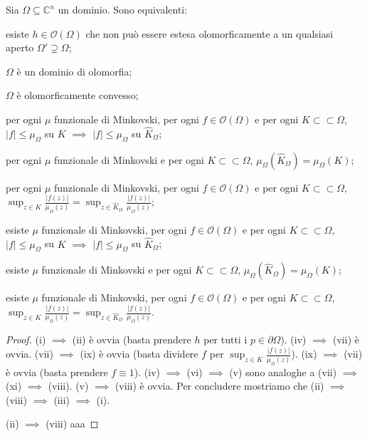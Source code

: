 \begin{thm}
  Sia $\Omega \subseteq \mathbb{C}^n$ un dominio. Sono equivalenti:
  \begin{nlist}
    \item esiste $h \in \mathcal{O}(\Omega)$ che non può essere estesa olomorficamente a un qualsiasi aperto $\Omega' \supsetneq \Omega$;
    \item $\Omega$ è un dominio di olomorfia;
    \item $\Omega$ è olomorficamente convesso;
    \item per ogni $\mu$ funzionale di Minkovski, per ogni $f \in \mathcal{O}(\Omega)$ e per ogni $K \subset\subset \Omega$, $|f| \le \mu_{\Omega}$ su $K$ $\implies$ $|f| \le \mu_\Omega$ su $\hat{K}_\Omega$;
    \item per ogni $\mu$ funzionale di Minkovski e per ogni $K \subset\subset \Omega$, $\mu_{\Omega}(\hat{K}_\Omega)=\mu_\Omega(K)$;
    \item per ogni $\mu$ funzionale di Minkovski, per ogni $f \in \mathcal{O}(\Omega)$ e per ogni $K \subset\subset \Omega$, $\displaystyle \sup_{z \in K} \frac{|f(z)|}{\mu_\Omega(z)}=\sup_{z\in\hat{K}_\Omega} \frac{|f(z)|}{\mu_\Omega(z)}$;
    \item esiste $\mu$ funzionale di Minkovski, per ogni $f \in \mathcal{O}(\Omega)$ e per ogni $K \subset\subset \Omega$, $|f| \le \mu_{\Omega}$ su $K$ $\implies$ $|f| \le \mu_\Omega$ su $\hat{K}_\Omega$;
    \item esiste $\mu$ funzionale di Minkovski e per ogni $K \subset\subset \Omega$, $\mu_{\Omega}(\hat{K}_\Omega)=\mu_\Omega(K)$;
    \item esiste $\mu$ funzionale di Minkovski, per ogni $f \in \mathcal{O}(\Omega)$ e per ogni $K \subset\subset \Omega$, $\displaystyle \sup_{z \in K} \frac{|f(z)|}{\mu_\Omega(z)}=\sup_{z\in\hat{K}_\Omega} \frac{|f(z)|}{\mu_\Omega(z)}$.
  \end{nlist}
\end{thm}

\begin{proof}
  (i) $\implies$ (ii) è ovvia (basta prendere $h$ per tutti i $p \in \partial\Omega$). (iv) $\implies$ (vii) è ovvia. (vii) $\implies$ (ix) è ovvia (basta dividere $f$ per $\displaystyle \sup_{z \in K} \frac{|f(z)|}{\mu_\Omega(z)}$). (ix) $\implies$ (vii) è ovvia (basta prendere $f \equiv 1$). (iv) $\implies$ (vi) $\implies$ (v) sono analoghe a (vii) $\implies$ (xi) $\implies$ (viii).
  (v) $\implies$ (viii) è ovvia. Per concludere mostriamo che (ii) $\implies$ (viii) $\implies$ (iii) $\implies$ (i).

  (ii) $\implies$ (viii) aaa
\end{proof}

